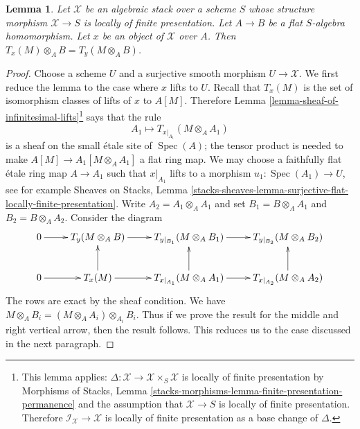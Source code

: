 \documentclass{stacks-project}
\theoremstyle{plain}
\newtheorem{lemma}[subsection]{Lemma}
\theoremstyle{definition}
\theoremstyle{remark}
\numberwithin{equation}{subsection}
\def\Spec{\mathop{\mathrm{Spec}}}
\begin{document}
\begin{lemma}
\label{lemma-T-quasi-coherent}
Let $\mathcal{X}$ be an algebraic stack over a scheme $S$ whose
structure morphism $\mathcal{X} \to S$ is locally of finite presentation.
Let $A \to B$ be a flat $S$-algebra homomorphism.
Let $x$ be an object of $\mathcal{X}$ over $A$.
Then $T_x(M) \otimes_A B = T_y(M \otimes_A B)$.
\end{lemma}

\begin{proof}
Choose a scheme $U$ and a surjective smooth morphism $U \to \mathcal{X}$.
We first reduce the lemma to the case where $x$ lifts to $U$.
Recall that $T_x(M)$ is the set of isomorphism classes of lifts of $x$
to $A[M]$. Therefore
Lemma \ref{lemma-sheaf-of-infinitesimal-lifts}\footnote{This lemma applies:
$\Delta : \mathcal{X} \to \mathcal{X} \times_S \mathcal{X}$
is locally of finite presentation by
Morphisms of Stacks, Lemma
\ref{stacks-morphisms-lemma-finite-presentation-permanence}
and the assumption that $\mathcal{X} \to S$ is locally of finite presentation.
Therefore $\mathcal{I}_\mathcal{X} \to \mathcal{X}$ is locally
of finite presentation as a base change of $\Delta$.}
says that the rule
$$
A_1 \mapsto T_{x|_{A_1}}(M \otimes_A A_1)
$$
is a sheaf on the small \'etale site of $\Spec(A)$; the tensor product
is needed to make $A[M] \to A_1[M \otimes_A A_1]$ a flat ring map.
We may choose a faithfully flat \'etale ring map $A \to A_1$
such that $x|_{A_1}$ lifts to a morphism $u_1 : \Spec(A_1) \to U$, see
for example Sheaves on Stacks, Lemma
\ref{stacks-sheaves-lemma-surjective-flat-locally-finite-presentation}.
Write $A_2 = A_1 \otimes_A A_1$ and set $B_1 = B \otimes_A A_1$
and $B_2 = B \otimes_A A_2$. Consider the diagram
$$
\xymatrix{
0 \ar[r] &
T_y(M \otimes_A B) \ar[r] &
T_{y|_{B_1}}(M \otimes_A B_1) \ar[r] &
T_{y|_{B_2}}(M \otimes_A B_2) \\
0 \ar[r] &
T_x(M) \ar[r] \ar[u] &
T_{x|_{A_1}}(M \otimes_A A_1) \ar[r] \ar[u] &
T_{x|_{A_2}}(M \otimes_A A_2) \ar[u]
}
$$
The rows are exact by the sheaf condition. We have
$M \otimes_A B_i = (M \otimes_A A_i) \otimes_{A_i} B_i$.
Thus if we prove the result for the middle and right vertical arrow, then
the result follows. This reduces us to the case discussed in
the next paragraph.


\end{proof}
\end{document}
